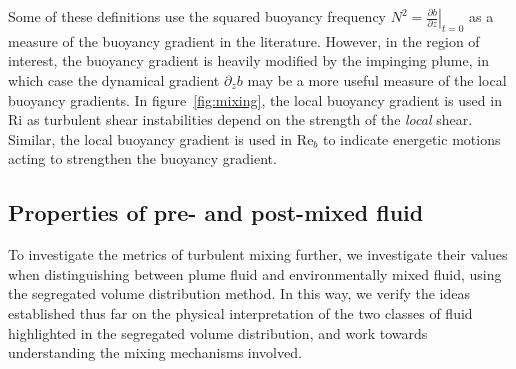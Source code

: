 \documentclass[a4paper]{article}
\begin{document}
Some of these definitions use the squared buoyancy frequency $N^2 = \left.\frac{\partial b}{\partial
z}\right|_{t=0}$ as a measure of the buoyancy gradient in the literature. However, in the region of interest,
the buoyancy gradient is heavily modified by the impinging plume, in which case the dynamical gradient
$\partial_z b$ may be a more useful measure of the local buoyancy gradients. In figure~\ref{fig:mixing}, the
local buoyancy gradient is used in $\mathrm{Ri}$ as turbulent shear instabilities depend on the strength of
the \emph{local} shear. Similar, the local buoyancy gradient is used in $\mathrm{Re}_b$ to indicate energetic
motions acting to strengthen the buoyancy gradient. 

\subsection{Properties of pre- and post-mixed fluid}
To investigate the metrics of turbulent mixing further, we investigate their values when distinguishing
between plume fluid and environmentally mixed fluid, using the segregated volume distribution method. In this
way, we verify the ideas established thus far on the physical interpretation of the two classes of fluid
highlighted in the segregated volume distribution, and work towards understanding the mixing mechanisms
involved.
\end{document}
